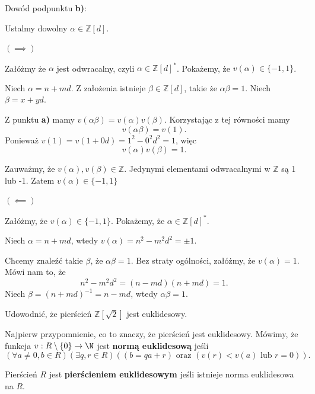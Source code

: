 \begin{solution}
\noindent Dowód podpunktu \textbf{b)}:

Ustalmy dowolny $\alpha \in \mathbb{Z} \left[ d \right]$.

\noindent $\bm{ \left( \implies \right)  } $ 

Załóżmy że $\alpha $ jest odwracalny, czyli $\alpha \in \mathbb{Z} \left[ d \right] ^{\ast} $. Pokażemy, że $v\left( \alpha  \right) \in \{-1,1\} $.

Niech $\alpha = n + md$.
Z założenia istnieje $\beta \in \mathbb{Z} \left[ d \right]$, takie że $\alpha \beta = 1$. Niech $\beta = x + yd$. 

Z punktu \textbf{a)} mamy $v\left( \alpha \beta  \right) = v\left( \alpha  \right) v\left( \beta  \right) $. Korzystając z tej równości mamy
\[
v\left( \alpha \beta  \right) = v\left( 1 \right) 
.\] 
Ponieważ $v\left( 1 \right) = v\left( 1 + 0d \right) = 1^2 - 0^2d^2 = 1$, więc 
\[
v\left( \alpha  \right) v\left( \beta  \right) = 1
.\] 

Zauważmy, że $v\left( \alpha  \right) ,v\left( \beta  \right) \in \mathbb{Z}$. Jedynymi elementami odwracalnymi w $\mathbb{Z} $ są 1 lub -1. Zatem $v\left( \alpha  \right) \in \{-1,1\} $

\noindent $\bm{ \left( \impliedby \right)  } $

Załóżmy, że $v\left( \alpha  \right) \in \{-1,1\} $. Pokażemy, że $\alpha \in \mathbb{Z} \left[ d \right] ^{\ast} $.

Niech $\alpha = n + md$, wtedy $v\left( \alpha  \right) = n^2-m^2d^2= \pm 1$.

Chcemy znaleźć takie $\beta$, że $\alpha \beta = 1$. Bez straty ogólności, załóżmy, że $v\left( \alpha  \right) = 1$. Mówi nam to, że 
\[
n^2 - m^2d^2 = \left( n-md \right) \left( n+md \right) = 1
.\] 
Niech $\beta = \left( n+md \right) ^{-1} = n-md$, wtedy $\alpha \beta = 1$.

\end{solution} 
\begin{problem}[7]
	Udowodnić, że pierścień $\mathbb{Z}\left[ \sqrt{2}  \right]$ jest euklidesowy.
\end{problem} 
\begin{note}

	Najpierw przypomnienie, co to znaczy, że pierścień jest euklidesowy.
	Mówimy, że funkcja $v: R\setminus \{0\} \to \N$ jest \textbf{normą euklidesową}  jeśli
	\[
	\left(\forall a\neq 0, b \in R \right)\left(\exists q,r \in R \right)\left( \left( b = qa + r \right) \text{ oraz } \left( v\left( r \right) < v\left( a \right) \text{ lub } r = 0 \right)  \right) 
	.\] 

	Pierścień $R$ jest \textbf{pierścieniem euklidesowym} jeśli istnieje norma euklidesowa na $R$.
\end{note}
